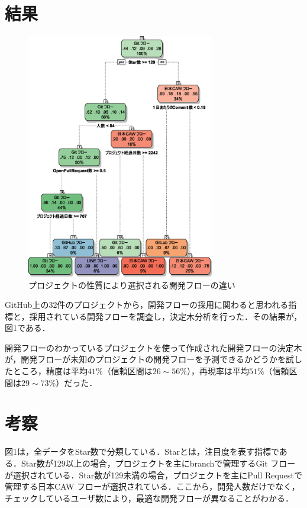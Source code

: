 \documentclass[uplatex,twocolumn]{jsarticle}
\begin{document}
\section{結果}
\begin{figure}
\includegraphics[width=8.2cm,clip]{decisiontree.eps}
\caption{プロジェクトの性質により選択される開発フローの違い}\label{決定木}
\end{figure}



GitHub上の32件のプロジェクトから，開発フローの採用に関わると思われる指標と，採用されている開発フローを調査し，決定木分析を行った．その結果が，図1である．



開発フローのわかっているプロジェクトを使って作成された開発フローの決定木が，開発フローが未知のプロジェクトの開発フローを予測できるかどうかを試したところ，精度は平均$41$\%（信頼区間は$26\sim 56$\%），再現率は平均$51$\%（信頼区間は$29\sim 73$\%）だった．



\section{考察}

図1は，全データをStar数で分類している．Starとは，注目度を表す指標である．Star数が129以上の場合，プロジェクトを主にbranchで管理するGit フローが選択されている．Star数が129未満の場合，プロジェクトを主にPull Requestで管理する日本CAW フローが選択されている．ここから，開発人数だけでなく，チェックしているユーザ数により，最適な開発フローが異なることがわかる．
\end{document}
